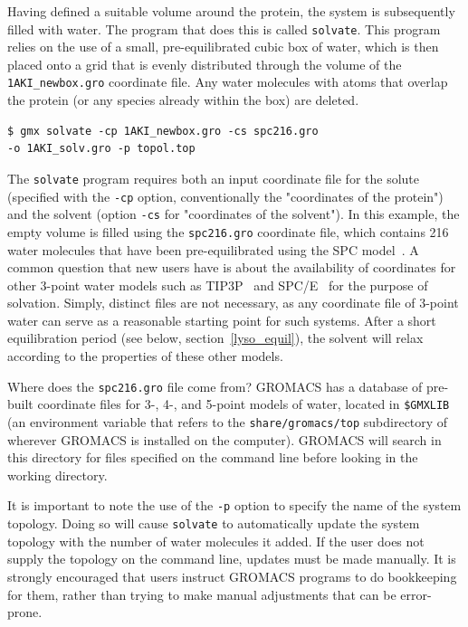 \documentclass[9pt,tutorial]{livecoms}
\begin{document}
Having defined a suitable volume around the protein, the system is subsequently filled with water. The program that does this is called \texttt{solvate}. This program relies on the use of a small, pre-equilibrated cubic box of water, which is then placed onto a grid that is evenly distributed through the volume of the \texttt{1AKI\_newbox.gro} coordinate file. Any water molecules with atoms that overlap the protein (or any species already within the box) are deleted.

\begin{verbatim}
$ gmx solvate -cp 1AKI_newbox.gro -cs spc216.gro 
-o 1AKI_solv.gro -p topol.top
\end{verbatim}

The \texttt{solvate} program requires both an input coordinate file for the solute (specified with the \texttt{-cp} option, conventionally the "coordinates of the protein") and the solvent (option \texttt{-cs} for "coordinates of the solvent"). In this example, the empty volume is filled using the \texttt{spc216.gro} coordinate file, which contains 216 water molecules that have been pre-equilibrated using the SPC model~\cite{Berendsen1981}. A common question that new users have is about the availability of coordinates for other 3-point water models such as TIP3P~\cite{Jorgensen1984} and SPC/E~\cite{Berendsen1987} for the purpose of solvation. Simply, distinct files are not necessary, as any coordinate file of 3-point water can serve as a reasonable starting point for such systems. After a short equilibration period (see below, section~\ref{lyso_equil}), the solvent will relax according to the properties of these other models.

Where does the \texttt{spc216.gro} file come from? GROMACS has a database of pre-built coordinate files for 3-, 4-, and 5-point models of water, located in \texttt{\$GMXLIB} (an environment variable that refers to the \texttt{share/gromacs/top} subdirectory of wherever GROMACS is installed on the computer). GROMACS will search in this directory for files specified on the command line before looking in the working directory.

It is important to note the use of the \texttt{-p} option to specify the name of the system topology. Doing so will cause \texttt{solvate} to automatically update the system topology with the number of water molecules it added. If the user does not supply the topology on the command line, updates must be made manually. It is strongly encouraged that users instruct GROMACS programs to do bookkeeping for them, rather than trying to make manual adjustments that can be error-prone.
\end{document}
